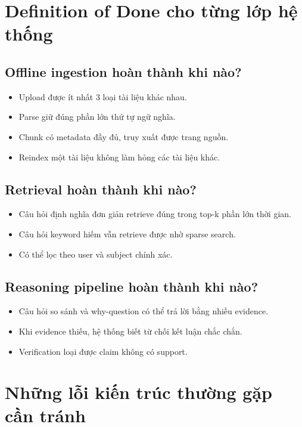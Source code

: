 \documentclass[12pt,a4paper]{article}
\begin{document}
\section{Definition of Done cho từng lớp hệ thống}

\subsection{Offline ingestion hoàn thành khi nào?}
\begin{itemize}
    \item Upload được ít nhất 3 loại tài liệu khác nhau.
    \item Parse giữ đúng phần lớn thứ tự ngữ nghĩa.
    \item Chunk có metadata đầy đủ, truy xuất được trang nguồn.
    \item Reindex một tài liệu không làm hỏng các tài liệu khác.
\end{itemize}

\subsection{Retrieval hoàn thành khi nào?}
\begin{itemize}
    \item Câu hỏi định nghĩa đơn giản retrieve đúng trong top-k phần lớn thời gian.
    \item Câu hỏi keyword hiếm vẫn retrieve được nhờ sparse search.
    \item Có thể lọc theo user và subject chính xác.
\end{itemize}

\subsection{Reasoning pipeline hoàn thành khi nào?}
\begin{itemize}
    \item Câu hỏi so sánh và why-question có thể trả lời bằng nhiều evidence.
    \item Khi evidence thiếu, hệ thống biết từ chối kết luận chắc chắn.
    \item Verification loại được claim không có support.
\end{itemize}

\section{Những lỗi kiến trúc thường gặp cần tránh}
\end{document}
